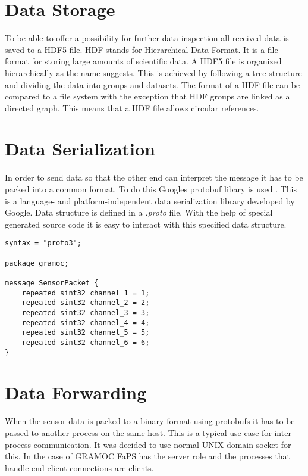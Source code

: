 
\section{Data Storage}

To be able to offer a possibility for further data inspection all received data is saved to a HDF5 file. HDF stands for Hierarchical Data Format. It is a file format for storing large amounts of scientific data. A HDF5 file is organized hierarchically as the name suggests. This is achieved by following a tree structure and dividing the data into groups and datasets. The format of a HDF file can be compared to a file system with the exception that HDF groups are linked as a directed graph. This means that a HDF file allows circular references.

\section{Data Serialization}


In order to send data so that the other end can interpret the message it has to be packed into a common format. To do this Googles protobuf libary is used \cite{Protobuf}. This is a language- and platform-independent data serialization library developed by Google. Data structure is defined in a \textit{.proto} file. With the help of special generated source code it is easy to interact with this specified data structure.

\begin{lstlisting}[caption={The \textit{.proto} file used by GRAMOC}, captionpos=b]
syntax = "proto3";

package gramoc;

message SensorPacket {
    repeated sint32 channel_1 = 1;
    repeated sint32 channel_2 = 2;
    repeated sint32 channel_3 = 3;
    repeated sint32 channel_4 = 4;
    repeated sint32 channel_5 = 5;
    repeated sint32 channel_6 = 6;
}
\end{lstlisting}

\section{Data Forwarding}

When the sensor data is packed to a binary format using protobufs it has to be passed to another process on the same host. This is a typical use case for inter-process communication. It was decided to use normal UNIX domain socket for this. In the case of GRAMOC FaPS has the server role and the processes that handle end-client connections are clients.

